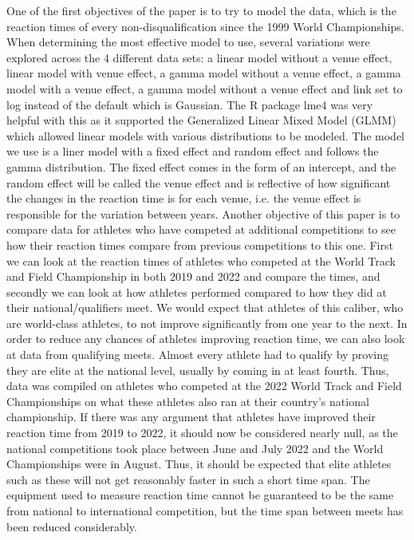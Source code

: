 \documentclass[12pt, letterpaper, titlepage]{article}
\begin{document}
One of the first objectives of the paper is to try to model the data, which is
the reaction times of every non-disqualification since the 1999 World Championships. 
When determining the most effective model to use, several variations were
explored across the 4 different data sets: a linear model without a venue effect,
linear model with venue effect, a gamma model without a venue effect, a gamma model
with a venue effect, a gamma model without a venue effect and link set to log instead
of the default which is Gaussian.  The R package lme4 was very helpful with this
as it supported the Generalized Linear Mixed Model (GLMM) which allowed 
linear models with various distributions to be modeled\citep{Rpkg:lme4}.  The
model we use is a liner model with a fixed effect and random effect and follows
the gamma distribution. The fixed effect comes in the form of an intercept, and the
random effect will be called the venue effect and is reflective of how significant
the changes in the reaction time is for each venue, i.e. the venue effect is 
responsible for the variation between years. 
Another objective of this paper is to compare data for athletes who have competed
at additional competitions to see how their reaction times compare from previous
competitions to this one. First we can look at the reaction times of athletes who competed at the
World Track and Field Championship in both 2019 and 2022 and compare the times,
and secondly we can look at how athletes performed compared to how they did at
their national/qualifiers meet.  We would expect that athletes of this caliber,
who are world-class athletes, to not improve significantly from one year to the
next.  In order to reduce any chances of athletes improving reaction time, we
can also look at data from qualifying meets.  Almost every athlete had to qualify 
by proving they are elite at the national level, usually by coming in at least
fourth. Thus, data was compiled on athletes who competed
at the 2022 World Track and Field Championships on what these athletes also ran 
at their country's national championship. If there was any argument that athletes
have improved their reaction time from 2019 to 2022, it should now be considered
nearly null, as the national competitions took place between June and July 2022 
and the World Championships were in August.  Thus, it should be expected that 
elite athletes such as these will not get reasonably faster in such a short time
span. The equipment used to measure reaction time cannot be guaranteed to be
the same from national to international competition, but the time span between
meets has been reduced considerably.
\end{document}
